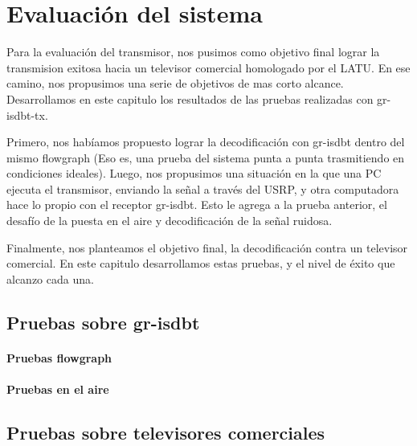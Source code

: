 \chapter{Evaluación del sistema}

Para la evaluación del transmisor, nos pusimos como objetivo final lograr la transmision exitosa hacia un televisor comercial homologado por el LATU. En ese camino, nos propusimos una serie de objetivos de mas corto alcance. Desarrollamos en este capitulo los resultados de las pruebas realizadas con gr-isdbt-tx.

Primero, nos habíamos propuesto lograr la decodificación con gr-isdbt dentro del mismo flowgraph (Eso es, una prueba del sistema punta a punta trasmitiendo en condiciones ideales). Luego, nos propusimos una situación en la que una PC ejecuta el transmisor, enviando la señal a través del USRP, y otra computadora hace lo propio con el receptor gr-isdbt. Esto le agrega a la prueba anterior, el desafío de la puesta en el aire y decodificación de la señal ruidosa.

Finalmente, nos planteamos el objetivo final, la decodificación contra un televisor comercial. En este capitulo desarrollamos estas pruebas, y el nivel de éxito que alcanzo cada una.

\section{Pruebas sobre gr-isdbt}

\subsubsection{Pruebas flowgraph}
\subsubsection{Pruebas en el aire}
\section{Pruebas sobre televisores comerciales}